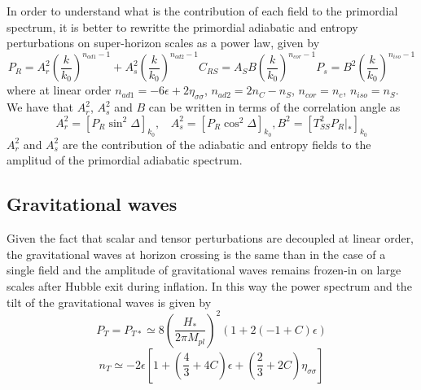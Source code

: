 \documentclass[amssymb,twocolumn,prd,nofootinbib,showpacs]{revtex4-1}
\begin{document}
In order to understand what is the contribution of each field to the primordial spectrum, it is better to rewritte the primordial adiabatic and entropy perturbations on super-horizon scales as a power law, given by
\begin{subequations}\label{PswAs}
\begin{equation}\label{PrAs}
P_R=A_r^2\left(\frac{k}{k_0}\right)^{n_{ad1}-1}+A_s^2\left(\frac{k}{k_0}\right)^{n_{ad2}-1}
\end{equation}
\begin{equation}\label{PrCrs}
C_{RS}=A_SB\left(\frac{k}{k_0}\right)^{n_{cor}-1}
\end{equation}
\begin{equation}\label{PsAs}
P_s=B^2\left(\frac{k}{k_0}\right)^{n_{iso}-1}
\end{equation}
\end{subequations}
where at linear order $n_{ad1}=-6\epsilon+2\eta_{\sigma\sigma}$, $n_{ad2}=2n_C-n_S$, $n_{cor}=n_c$, $n_{iso}=n_S$. We have that $A_r^2$, $A_s^2$ and $B$ can be written in terms of the correlation angle as
\begin{subequations}
\label{RelAs}
\begin{equation}
A_r^2=[P_R\sin^2\Delta]_{k_0}, \ \ \ \ A_s^2=[P_R\cos^2\Delta]_{k_0},
\end{equation}
\begin{equation}
B^2=[T_{SS}^2 P_R|_*]_{k_0}
\end{equation}
\end{subequations}
$A_r^2$ and $A_s^2$ are the contribution of the adiabatic and entropy fields to the amplitud of the primordial adiabatic spectrum. 
\subsection{Gravitational waves}

Given the fact that scalar and tensor perturbations are decoupled at linear order, the gravitational waves at horizon crossing is the same than in the case of a single field and the amplitude of gravitational waves remains frozen-in on large scales after Hubble exit during inflation. In this way the power spectrum and the tilt of the gravitational waves is given by
\begin{equation}
P_T=P_{T*}\simeq 8 \left(\frac{H_*}{2\pi M_{pl}}\right)^2(1+2(-1+C)\epsilon)
\end{equation}
\begin{equation}\label{tiltsnt}
n_T\simeq -2\epsilon\left[1+\left(\frac{4}{3}+4C\right)\epsilon+\left(\frac{2}{3}+2C\right)\eta_{\sigma\sigma}\right]
\end{equation}
\end{document}
